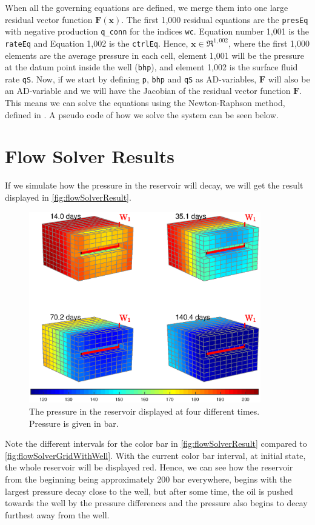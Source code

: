 When all the governing equations are defined, we merge them into one large residual vector function $\boldsymbol{F}(\boldsymbol{x})$. The first 1,000 residual equations are the \texttt{presEq} with negative production \texttt{q\_conn} for the indices \texttt{wc}. Equation number 1,001 is the \texttt{rateEq} and Equation 1,002 is the \texttt{ctrlEq}. Hence, $\boldsymbol{x}\in\Re^{1,002}$, where the first 1,000 elements are the average pressure in each cell, element 1,001 will be the pressure at the datum point inside the well (\texttt{bhp}), and element 1,002 is the surface fluid rate \texttt{qS}. Now, if we start by defining \texttt{p}, \texttt{bhp} and \texttt{qS} as AD-variables, $\boldsymbol{F}$ will also be an AD-variable and we will have the Jacobian of the residual vector function $\boldsymbol{F}$. This means we can solve the equations using the Newton-Raphson method, defined in . A pseudo code of how we solve the system can be seen below.


\section{Flow Solver Results}
\label{sec:FlowSolverResults}
If we simulate how the pressure in the reservoir will decay, we will get the result displayed in \autoref{fig:flowSolverResult}.
\begin{figure}[H]
    \centering
    \includegraphics[width = 0.9\textwidth]{figures/flowSolver_result.eps}
    \caption{The pressure in the reservoir displayed at four different times. Pressure is given in bar.}
    \label{fig:flowSolverResult}
\end{figure}
Note the different intervals for the color bar in \autoref{fig:flowSolverResult} compared to \autoref{fig:flowSolverGridWithWell}. With the current color bar interval, at initial state, the whole reservoir will be displayed red. Hence, we can see how the reservoir from the beginning being approximately 200 bar everywhere, begins with the largest pressure decay close to the well, but after some time, the oil is pushed towards the well by the pressure differences and the pressure also begins to decay furthest away from the well. 

